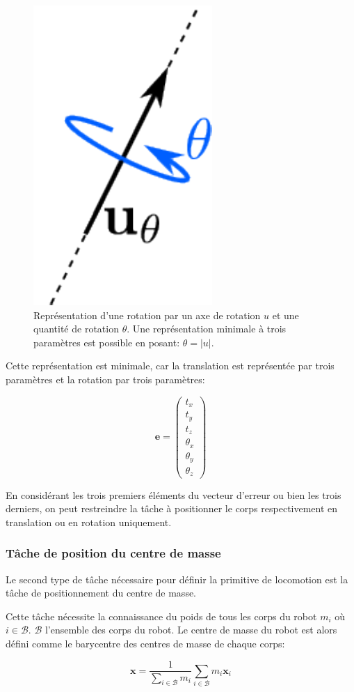 \begin{figure}
  \begin{center}
    \includegraphics[width=.1\linewidth]{src/chap3-primitive-mouvement/utheta.pdf}
  \end{center}
  \caption{Représentation d'une rotation par un axe de rotation $u$ et
    une quantité de rotation $\theta$. Une représentation minimale à
    trois paramètres est possible en posant: $\theta = |u|$. \label{fig:utheta}}
\end{figure}


Cette représentation est minimale, car la translation est représentée
par trois paramètres et la rotation par trois paramètres:

\begin{equation}
  \mathbf{e} = \left(
  \begin{array}{c}
    t_x\\
    t_y\\
    t_z\\
    \theta_x\\
    \theta_y\\
    \theta_z
  \end{array}
  \right)
\end{equation}

En considérant les trois premiers éléments du vecteur d'erreur ou bien
les trois derniers, on peut restreindre la tâche à positionner le corps
respectivement en translation ou en rotation uniquement.


\subsubsection{Tâche de position du centre de masse}


Le second type de tâche nécessaire pour définir la primitive de
locomotion est la tâche de positionnement du centre de masse.

Cette tâche nécessite la connaissance du poids de tous les corps du
robot $m_i$ où $i \in \mathcal{B}$. $\mathcal{B}$ l'ensemble des corps
du robot. Le centre de masse du robot est alors
défini comme le barycentre des centres de masse de chaque corps:

\begin{equation}
  \mathbf{x} = \frac{1}{\sum_{i \in \mathcal{B}} m_i} \sum_{i \in \mathcal{B}} m_i \mathbf{x}_i
\end{equation}

